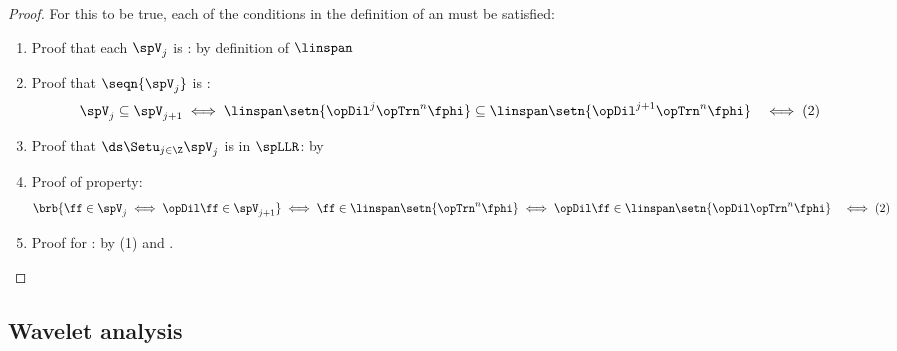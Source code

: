 \begin{proof}
For this to be true, each of the conditions in the definition of an   must be satisfied:
\begin{enumerate}
  \item Proof that each $\spV_j$ is : by definition of $\linspan$

  \item Proof that $\seqn{\spV_j}$ is : 
    \begin{align*}
      \spV_j\subseteq\spV_{j+1}
        &\iff \linspan\setn{\opDil^j\opTrn^n\fphi}\subseteq\linspan\setn{\opDil^{j+1}\opTrn^n\fphi}
        &\iff (2)
    \end{align*}

  \item Proof that $\ds\Setu_{j\in\Z}\spV_j$ is  in $\spLLR$: by 
  
  \item Proof of  property:
    \begin{align*}
      \brb{\ff\in\spV_j\iff\opDil\ff\in\spV_{j+1}}
        &\iff \ff\in\linspan\setn{\opTrn^n\fphi}\iff\opDil\ff\in\linspan\setn{\opDil\opTrn^n\fphi}
        &\iff (2)
    \end{align*}

  \item Proof for : by (1) and .
\end{enumerate}
\end{proof}



\subsection{Wavelet analysis}
